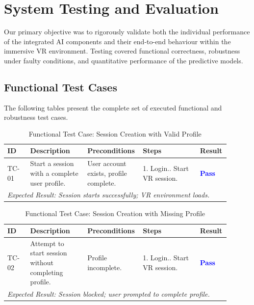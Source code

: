 \chapter{System Testing and Evaluation}
\label{chap:testingEvaluation}


Our primary objective was to rigorously validate both the individual performance of the integrated AI components and their end-to-end behaviour within the immersive VR environment. Testing covered functional correctness, robustness under faulty conditions, and quantitative performance of the predictive models.

\section{Functional Test Cases}

The following tables present the complete set of executed functional and robustness test cases.

\begin{table}[H]
\centering
\renewcommand{\arraystretch}{1.3}
\caption{Functional Test Case: Session Creation with Valid Profile}
\label{tab:tc_session_valid}
\begin{tabular}{|p{0.1\linewidth}|p{0.25\linewidth}|p{0.2\linewidth}|p{0.25\linewidth}|p{0.1\linewidth}|}
\hline
\rowcolor{gray!15} \textbf{ID} & \textbf{Description} & \textbf{Preconditions} & \textbf{Steps} & \textbf{Result} \\ \hline
TC-01 & Start a session with a complete user profile. & User account exists, profile complete. & 1. Login.\newline 2. Start VR session. & \textcolor{blue}{\textbf{Pass}} \\ \hline
\multicolumn{5}{|p{0.9\linewidth}|}{\textit{Expected Result: Session starts successfully; VR environment loads.}} \\ \hline
\end{tabular}
\end{table}

\begin{table}[H]
\centering
\renewcommand{\arraystretch}{1.3}
\caption{Functional Test Case: Session Creation with Missing Profile}
\label{tab:tc_session_missing}
\begin{tabular}{|p{0.1\linewidth}|p{0.25\linewidth}|p{0.2\linewidth}|p{0.25\linewidth}|p{0.1\linewidth}|}
\hline
\rowcolor{gray!15} \textbf{ID} & \textbf{Description} & \textbf{Preconditions} & \textbf{Steps} & \textbf{Result} \\ \hline
TC-02 & Attempt to start session without completing profile. & Profile incomplete. & 1. Login.\newline 2. Start VR session. & \textcolor{blue}{\textbf{Pass}} \\ \hline
\multicolumn{5}{|p{0.9\linewidth}|}{\textit{Expected Result: Session blocked; user prompted to complete profile.}} \\ \hline
\end{tabular}
\end{table}

